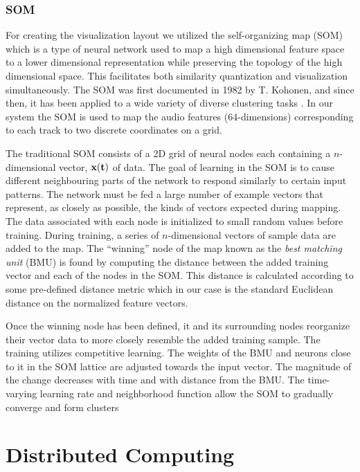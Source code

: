 \documentclass[12pt,oneside]{book}
\begin{document}
\subsubsection{SOM}

For creating the visualization layout we utilized the self-organizing
map (SOM) which is a type of neural network used to map a high
dimensional feature space to a lower dimensional representation while
preserving the topology of the high dimensional space. This
facilitates both similarity quantization and visualization
simultaneously. The SOM was first documented in 1982 by T. Kohonen,
and since then, it has been applied to a wide variety of diverse
clustering tasks \cite{kohonen95a}. In our system the SOM is used to
map the audio features (64-dimensions) corresponding to each track to
two discrete coordinates on a grid.

The traditional SOM consists of a 2D grid of neural nodes each
containing a $n$-dimensional vector, $ {\bf x(t)} $ of data. The goal
of learning in the SOM is to cause different neighbouring parts of the
network to respond similarly to certain input patterns. The network
must be fed a large number of example vectors that represent, as
closely as possible, the kinds of vectors expected during mapping. The
data associated with each node is initialized to small random values
before training. During training, a series of $n$-dimensional vectors
of sample data are added to the map.  The ``winning'' node of the map
known as the {\it best matching unit} (BMU) is found by computing the
distance between the added training vector and each of the nodes in
the SOM. This distance is calculated according to some pre-defined
distance metric which in our case is the standard Euclidean distance
on the normalized feature vectors.

Once the winning node has been defined, it and its surrounding nodes
reorganize their vector data to more closely resemble the added
training sample.  The training utilizes competitive learning. The
weights of the BMU and neurons close to it in the SOM lattice are
adjusted towards the input vector. The magnitude of the change
decreases with time and with distance from the BMU. The time-varying
learning rate and neighborhood function allow the SOM to gradually
converge and form clusters


\section{Distributed Computing}
\end{document}
